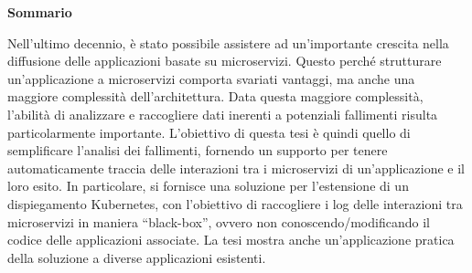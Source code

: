\vspace*{\fill}
\thispagestyle{empty}

{\large \centering \textbf{Sommario} \par}

\vspace{1em} %

\noindent
Nell'ultimo decennio, è stato possibile assistere ad un'importante crescita nella diffusione delle applicazioni basate su microservizi. Questo perché strutturare un'applicazione a microservizi comporta svariati vantaggi, ma anche una maggiore complessità dell'architettura. Data questa maggiore complessità, l'abilità di analizzare e raccogliere dati inerenti a potenziali fallimenti risulta particolarmente importante. L'obiettivo di questa tesi è quindi quello di semplificare l'analisi dei fallimenti, fornendo un supporto per tenere automaticamente traccia delle interazioni tra i microservizi di un'applicazione e il loro esito. In particolare, si fornisce una soluzione per l'estensione di un dispiegamento Kubernetes, con l'obiettivo di raccogliere i log delle interazioni tra microservizi in maniera \enquote{black-box}, ovvero non conoscendo/modificando il codice delle applicazioni associate. La tesi mostra anche un'applicazione pratica della soluzione a diverse applicazioni esistenti.
\vspace*{\fill}